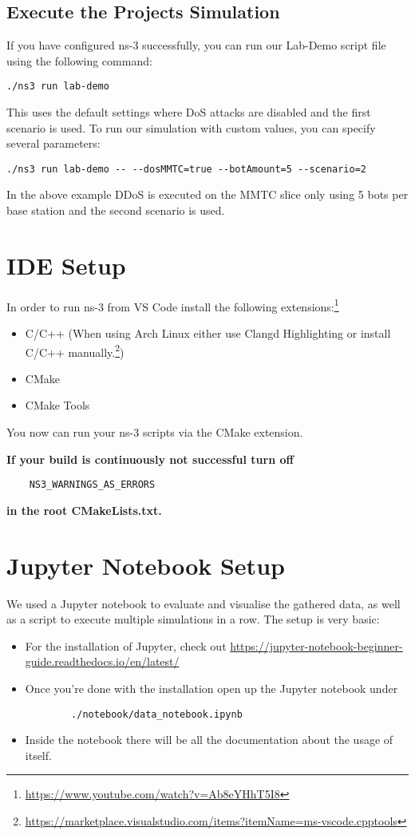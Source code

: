 \subsection{Execute the Projects Simulation}
If you have configured ns-3 successfully, you can run our Lab-Demo script file using the following command:
\begin{verbatim}
./ns3 run lab-demo
\end{verbatim}
This uses the default settings where DoS attacks are disabled and the first scenario is used. To run our simulation with custom values, you can specify several parameters:
\begin{verbatim}
./ns3 run lab-demo -- --dosMMTC=true --botAmount=5 --scenario=2
\end{verbatim}
In the above example DDoS is executed on the MMTC slice only using 5 bots per base station and the second scenario is used.

\section{IDE Setup}

In order to run ns-3 from VS Code install the following extensions:\footnote[3]{\url{https://www.youtube.com/watch?v=Ab8eYHhT5I8}}
\begin{itemize}
    \item C/C++ (When using Arch Linux either use Clangd Highlighting or install C/C++ manually.\footnote[4]{\url{https://marketplace.visualstudio.com/items?itemName=ms-vscode.cpptools}})
    \item CMake
    \item CMake Tools
\end{itemize}
You now can run your ns-3 scripts via the CMake extension.

\textbf{If your build is continuously not successful turn off} \begin{verbatim}
    NS3_WARNINGS_AS_ERRORS
\end{verbatim} \textbf{in the root CMakeLists.txt.}

\section{Jupyter Notebook Setup}
We used a Jupyter notebook to evaluate and visualise the gathered data, as well as a script to execute multiple simulations in a row. The setup is very basic:
\begin{itemize}
    \item For the installation of Jupyter, check out \url{https://jupyter-notebook-beginner-guide.readthedocs.io/en/latest/}
    \item Once you're done with the installation open up the Jupyter notebook under \begin{verbatim}
        ./notebook/data_notebook.ipynb
    \end{verbatim}
    \item Inside the notebook there will be all the documentation about the usage of itself.
\end{itemize}

